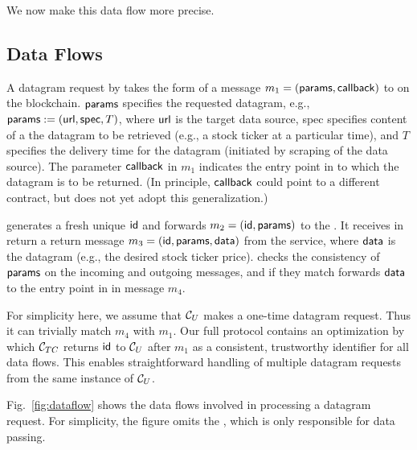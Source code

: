 \noindent We now make this data flow more precise. 

\subsection{Data Flows}
\label{sec:protocol-data-flows}

A datagram request by \reqcont takes the form of a message $m_1 = ({\sf params}, {\sf callback})$ to \tcont on the blockchain. ${\sf params}$ specifies the requested datagram, e.g., ${\sf params} := ({{\sf url}}, {\sf spec}, T)$, where ${{\sf url}}$ is the target data source, {\sf spec} specifies content of a the datagram to be retrieved (e.g., a stock ticker at a particular time), and $T$ specifies the delivery time for the datagram (initiated by scraping of the data source). The parameter ${\sf callback}$ in $m_1$ indicates the entry point in \reqcont to which the datagram is to be returned. (In principle, ${\sf callback}$ could point to a different contract, but \tc does not yet adopt this generalization.) 

\tcont generates a fresh unique ${\sf id}$ and forwards $m_2 = ({\sf id}, {\sf params})$ to the \encname. It receives in return a return message $m_3 = ({\sf id}, {\sf params}, {\sf data})$ from the \tc service, where ${\sf data}$ is the datagram (e.g., the desired stock ticker price). \tcont checks the consistency of ${\sf params}$ on the incoming and outgoing messages, and if they match forwards ${\sf data}$ to the entry point \dgcallback in \reqcont in message $m_4$.

For simplicity here, we assume that $\reqcont$ makes a one-time datagram request. Thus it can trivially match $m_4$ with $m_1$. Our full protocol contains an optimization by which $\tcont$ returns ${\sf id}$ to $\reqcont$ after $m_1$ as a consistent, trustworthy identifier for all data flows. This enables straightforward handling of multiple datagram requests from the same instance of $\reqcont$.

Fig.~\ref{fig:dataflow} shows the data flows involved in processing a datagram request. For simplicity, the figure omits the \medname, which is only responsible for data passing.


